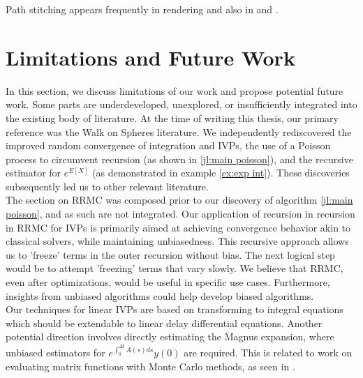 \documentclass[a4paper,12pt]{article}
\begin{document}
\begin{related}
  Path stitching appears frequently in rendering and also in \cite{das_sarma_fast_2015}
  and \cite{ji_reusing_2012}.
\end{related}



\section{Limitations and Future Work}

In this section, we discuss limitations of our work and propose potential future work.
Some parts are underdeveloped, unexplored, or insufficiently integrated
into the existing body of literature. At the time of writing this thesis, our
primary reference was the Walk on Spheres literature. We independently rediscovered
the improved random convergence of integration and IVPs, the
use of a Poisson process to circumvent recursion (as shown in \ref{jl:main poisson}),
and the recursive estimator for $e^{E[X]}$ (as demonstrated in example \ref{ex:exp int}).
These discoveries subsequently led us to other relevant literature. \\

The section on RRMC was composed prior to our discovery of algorithm \ref{jl:main poisson},
and as such are not integrated. Our application of
recursion in recursion in RRMC for IVPs is primarily aimed at achieving convergence behavior
akin to classical solvers, while maintaining unbiasedness. This recursive approach allows us to
'freeze' terms in the outer recursion without bias. The next logical step would be
to attempt 'freezing' terms that vary slowly. We believe that RRMC, even after optimizations, would
be useful in specific use cases. Furthermore, insights from unbiased algorithms could
help develop biased algorithms. \\

Our techniques for linear IVPs are based on transforming to integral equations which should be extendable
to linear delay differential equations. Another potential direction involves directly estimating
the Magnus expansion, where unbiased estimators for $e^{\int_{0}^{\Delta t} A(s)ds} y(0)$ are required.
This is related to work on evaluating matrix functions with Monte Carlo methods, as seen in \cite{guidotti_fast_2023}. \\
\end{document}
